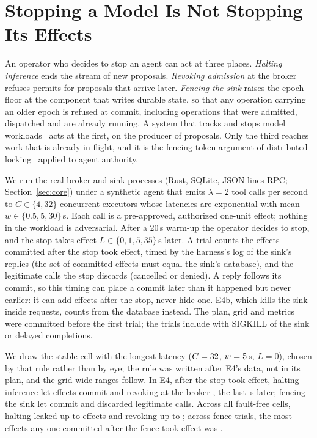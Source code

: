 \section{Stopping a Model Is Not Stopping Its Effects}\label{sec:v6stop}

An operator who decides to stop an agent can act at three places. \emph{Halting inference} ends the stream of new
proposals. \emph{Revoking admission} at the broker refuses permits for proposals that arrive later. \emph{Fencing the
sink} raises the epoch floor at the component that writes durable state, so that any operation carrying an older epoch
is refused at commit, including operations that were admitted, dispatched and are already running. A system that
tracks and stops model workloads~\cite{controlroom} acts at the first, on the producer of proposals. Only the third reaches work that is already in flight, and it
is the fencing-token argument of distributed locking~\cite{kleppmann2016} applied to agent authority.

 We run the real broker and sink processes (Rust, SQLite, JSON-lines RPC; Section~\ref{sec:core})
under a synthetic agent that emits \(\lambda = 2\) tool calls per second to \(C \in \{4, 32\}\) concurrent executors
whose latencies are exponential with mean \(w \in \{0.5, 5, 30\}\)\,s. Each call is a pre-approved, authorized one-unit
effect; nothing in the workload is adversarial. After a 20\,s warm-up the operator decides to stop, and the stop takes
effect \(L \in \{0, 1, 5, 35\}\)\,s later. A trial counts the effects committed after the stop took effect, timed
by the harness's log of the sink's replies (the set of committed effects must equal the sink's database), and the
legitimate calls the stop discards (cancelled or denied). A reply follows its commit, so this timing can place a commit
later than it happened but never earlier: it can add effects after the stop, never hide one. E4b, which kills the sink
inside requests, counts from the database instead. The plan, grid and
metrics were committed before the first trial; the \vsixEFourTrials{}
trials include \vsixEFourFaultTrials{} with SIGKILL of the sink or delayed completions.

 We draw the stable cell with the longest latency (\(C = 32\),
\(w = 5\)\,s, \(L = 0\)), chosen by that rule rather than by eye; the rule was written after E4's
data, not in its plan, and the grid-wide ranges follow. In E4, after the stop took effect, halting
inference let \vsixHaltRange{} effects commit and revoking at the broker \vsixRevokeRange{}, the last
\vsixLastCommitSeconds\,s later; fencing the sink let \vsixFenceRange{} commit and discarded \vsixFenceLost{}
legitimate calls. Across all \vsixEFourCells{} fault-free cells, halting leaked up to \vsixGridHaltMax{} effects and
revoking up to \vsixGridRevokeMax; across \vsixFenceTrials{} fence trials, the most effects any one committed after
the fence took effect was \vsixFencePostMax. \vsixEFourIdentitySentence

